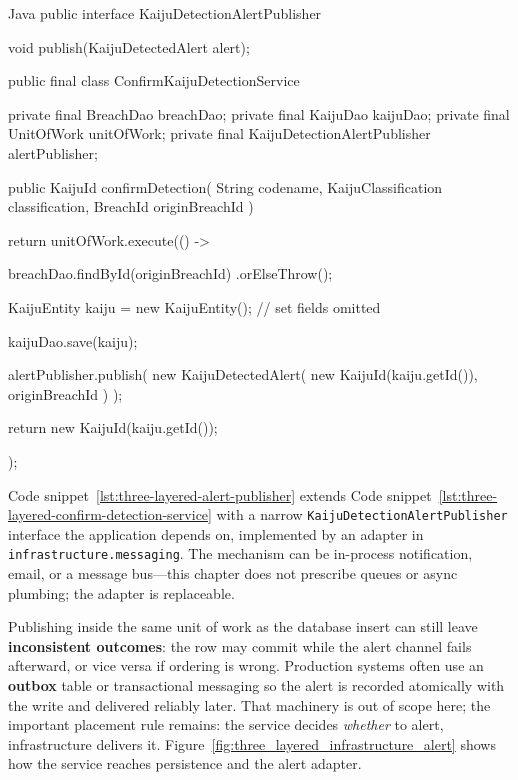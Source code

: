 \begin{ridercode}{Java}
public interface KaijuDetectionAlertPublisher
{

    void publish(KaijuDetectedAlert alert);

}

public final class ConfirmKaijuDetectionService
{
    private final BreachDao breachDao;
    private final KaijuDao kaijuDao;
    private final UnitOfWork unitOfWork;
    private final KaijuDetectionAlertPublisher alertPublisher;

    public KaijuId confirmDetection(
        String codename,
        KaijuClassification classification,
        BreachId originBreachId
    )
    {
        return unitOfWork.execute(() ->
        {
            breachDao.findById(originBreachId)
                .orElseThrow();

            KaijuEntity kaiju = new KaijuEntity();
            // set fields omitted

            kaijuDao.save(kaiju);

            alertPublisher.publish(
                new KaijuDetectedAlert(
                    new KaijuId(kaiju.getId()),
                    originBreachId
                )
            );

            return new KaijuId(kaiju.getId());
        });
    }
}
\end{ridercode}
\label{lst:three-layered-alert-publisher}

Code snippet~\ref{lst:three-layered-alert-publisher} extends Code snippet~\ref{lst:three-layered-confirm-detection-service} with a narrow \texttt{KaijuDetectionAlertPublisher} interface the application depends on, implemented by an adapter in \texttt{infrastructure.messaging}. The mechanism can be in-process notification, email, or a message bus---this chapter does not prescribe queues or async plumbing; the adapter is replaceable.

Publishing inside the same unit of work as the database insert can still leave \textbf{inconsistent outcomes}: the row may commit while the alert channel fails afterward, or vice versa if ordering is wrong. Production systems often use an \textbf{outbox} table or transactional messaging so the alert is recorded atomically with the write and delivered reliably later. That machinery is out of scope here; the important placement rule remains: the service decides \textit{whether} to alert, infrastructure delivers it. Figure~\ref{fig:three_layered_infrastructure_alert} shows how the service reaches persistence and the alert adapter.

